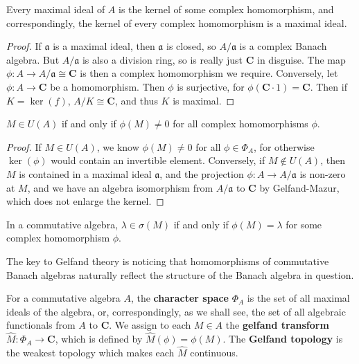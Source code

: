 \begin{lemma}
    Every maximal ideal of $A$ is the kernel of some complex homomorphism, and correspondingly, the kernel of every complex homomorphism is a maximal ideal.
\end{lemma}
\begin{proof}
    If $\mathfrak{a}$ is a maximal ideal, then $\mathfrak{a}$ is closed, so $A/\mathfrak{a}$ is a complex Banach algebra. But $A/\mathfrak{a}$ is also a division ring, so is really just $\mathbf{C}$ in disguise. The map $\phi: A \to A/\mathfrak{a} \cong \mathbf{C}$ is then a complex homomorphism we require. Conversely, let $\phi: A \to \mathbf{C}$ be a homomorphism. Then $\phi$ is surjective, for $\phi(\mathbf{C} \cdot 1) = \mathbf{C}$. Then if $K = \ker(f)$, $A/K \cong \mathbf{C}$, and thus $K$ is maximal.
\end{proof}

\begin{lemma}
    $M \in U(A)$ if and only if $\phi(M) \neq 0$ for all complex homomorphisms $\phi$.
\end{lemma}
\begin{proof}
    If $M \in U(A)$, we know $\phi(M) \neq 0$ for all $\phi \in \Phi_A$, for otherwise $\ker(\phi)$ would contain an invertible element. Conversely, if $M \not \in U(A)$, then $M$ is contained in a maximal ideal $\mathfrak{a}$, and the projection $\phi: A \to A/\mathfrak{a}$ is non-zero at $M$, and we have an algebra isomorphism from $A/\mathfrak{a}$ to $\mathbf{C}$ by Gelfand-Mazur, which does not enlarge the kernel.
\end{proof}

\begin{corollary} \label{spectralhomomorphism}
    In a commutative algebra, $\lambda \in \sigma(M)$ if and only if $\phi(M) = \lambda$ for some complex homomorphism $\phi$.
\end{corollary}

The key to Gelfand theory is noticing that homomorphisms of commutative Banach algebras naturally reflect the structure of the Banach algebra in question.

\begin{definition}
    For a commutative algebra $A$, the {\bf character space} $\Phi_A$ is the set of all maximal ideals of the algebra, or, correspondingly, as we shall see, the set of all algebraic functionals from $A$ to $\mathbf{C}$. We assign to each $M \in A$ the {\bf gelfand transform} $\widehat{M}: \Phi_A \to \mathbf{C}$, which is defined by $\widehat{M}(\phi) = \phi(M)$. The {\bf Gelfand topology} is the weakest topology which makes each $\widehat{M}$ continuous.
\end{definition}


